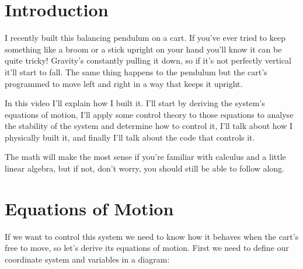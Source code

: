 \documentclass{article}
\begin{document}
\tableofcontents

\section{Introduction}

I recently built this balancing pendulum on a cart. If you've ever tried to keep something like a broom or a stick upright on your hand you'll know it can be quite tricky! Gravity's constantly pulling it down, so if it’s not perfectly vertical it’ll start to fall. The same thing happens to the pendulum but the cart's programmed to move left and right in a way that keeps it upright.

In this video I’ll explain how I built it. I'll start by deriving the system's equations of motion, I'll apply some control theory to those equations to analyse the stability of the system and determine how to control it, I'll talk about how I physically built it, and finally I'll talk about the code that controls it.

The math will make the most sense if you're familiar with calculus and a little linear algebra, but if not, don't worry, you should still be able to follow along.

\section{Equations of Motion}

If we want to control this system we need to know how it behaves when the cart's free to move, so let’s derive its equations of motion. First we need to define our coordinate system and variables in a diagram:

\begin{figure}[h]
  \centering
\end{figure}
\end{document}

